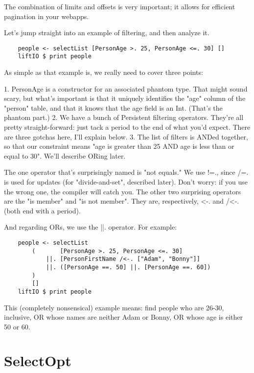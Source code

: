 The combination of limits and offsets is very important; it allows for efficient pagination in your webapps.

Let's jump straight into an example of filtering, and then analyze it.

\begin{lstlisting}
    people <- selectList [PersonAge >. 25, PersonAge <=. 30] []
    liftIO $ print people
\end{lstlisting}%

As simple as that example is, we really need to cover three points:


1. PersonAge is a constructor for an associated phantom type. That might sound scary, but what's important is that it uniquely identifies the "age" column of the "person" table, and that it knows that the age field is an Int. (That's the phantom part.)
2. We have a bunch of Persistent filtering operators. They're all pretty straight-forward: just tack a period to the end of what you'd expect. There are three gotchas here, I'll explain below.
3. The list of filters is ANDed together, so that our constraint means "age is greater than 25 AND age is less than or equal to 30". We'll describe ORing later.

The one operator that's surprisingly named is "not equals." We use !=., since /=. is used for updates (for "divide-and-set", described later). Don't worry: if you use the wrong one, the compiler will catch you. The other two surprising operators are the "is member" and "is not member". They are, respectively, <-. and /<-. (both end with a period).

And regarding ORs, we use the ||. operator. For example:

\begin{lstlisting}
    people <- selectList
        (       [PersonAge >. 25, PersonAge <=. 30]
            ||. [PersonFirstName /<-. ["Adam", "Bonny"]]
            ||. ([PersonAge ==. 50] ||. [PersonAge ==. 60])
        )
        []
    liftIO $ print people
\end{lstlisting}%

This (completely nonsensical) example means: find people who are 26-30, inclusive, OR whose names are neither Adam or Bonny, OR whose age is either 50 or 60.

\section{SelectOpt}

